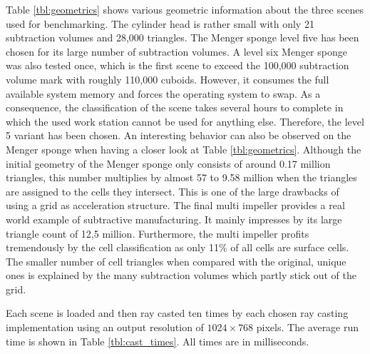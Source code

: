 Table \ref{tbl:geometrics} shows various geometric information about the three scenes used for benchmarking. The cylinder head is rather small with only 21 subtraction volumes and 28,000 triangles. The Menger sponge level five has been chosen for its large number of subtraction volumes. A level six Menger sponge was also tested once, which is the first scene to exceed the 100,000 subtraction volume mark with roughly 110,000 cuboids. However, it consumes the full available system memory and forces the operating system to swap. As a consequence, the classification of the scene takes several hours to complete in which the used work station cannot be used for anything else. Therefore, the level 5 variant has been chosen. An interesting behavior can also be observed on the Menger sponge when having a closer look at Table \ref{tbl:geometrics}. Although the initial geometry of the Menger sponge only consists of around 0.17 million triangles, this number multiplies by almost 57 to 9.58 million when the triangles are assigned to the cells they intersect. This is one of the large drawbacks of using a grid as acceleration structure. The final multi impeller provides a real world example of subtractive manufacturing. It mainly impresses by its large triangle count of 12,5 million. Furthermore, the multi impeller profits tremendously by the cell classification as only 11\% of all cells are surface cells. The smaller number of cell triangles when compared with the original, unique ones is explained by the many subtraction volumes which partly stick out of the grid.

Each scene is loaded and then ray casted ten times by each chosen ray casting implementation using an output resolution of $1024 \times 768$ pixels. The average run time is shown in Table \ref{tbl:cast_times}. All times are in milliseconds.

